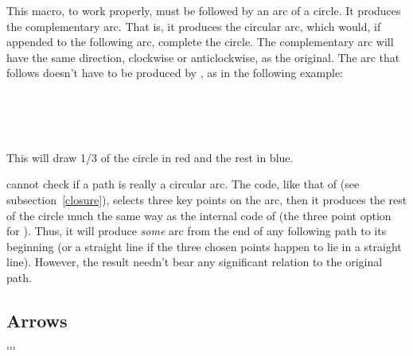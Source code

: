 \documentclass[letterpaper]{article}
\begin{document}
This macro, to work properly, must be followed by an arc of a circle. It
produces the complementary arc. That is, it produces the circular arc,
which would, if appended to the following arc, complete the circle. The
complementary arc will have the same direction, clockwise or
anticlockwise, as the original. The arc that follows doesn't have to be
produced by , as in the following example:
\begin{ex}
\\
\ \\
\ 
\end{ex}
This will draw 1/3 of the circle in red and the rest in blue.

\CMF{} cannot check if a path is really a circular arc. The \MF{} code,
like that of  (see subsection~\ref{closure}), selects
three key points on the arc, then it produces the rest of the circle
much the same way as the internal code of  (the three
point option for ). Thus, it will produce \emph{some} arc from
the end of any following path to its beginning (or a straight line if
the three chosen points happen to lie in a straight line). However, the
result needn't bear any significant relation to the original path.


\subsection{Arrows}\label{arrows}

\begin{cd}
%
    $\ldots$\\
%
    $\ldots$%
\end{cd}
\end{document}
